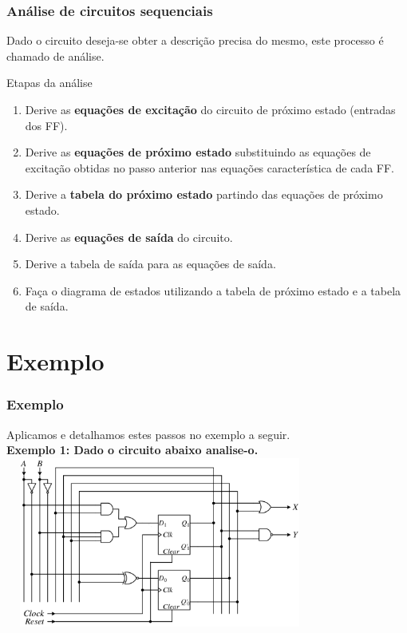 \documentclass{beamer}
\begin{document}
\begin{frame}
  \frametitle{Análise de circuitos sequenciais}
  Dado o circuito deseja-se obter a descrição precisa do mesmo, este processo é 
  chamado de análise.

  \begin{block}{Etapas da análise}
   \begin{enumerate}
    \item Derive as \textbf{equações de excitação} do circuito de próximo 
      estado (entradas dos FF).
      \pause
    \item Derive as \textbf{equações de próximo estado} substituindo as 
      equações de excitação obtidas no passo anterior nas equações 
      característica de cada FF.
      \pause
    \item Derive a \textbf{tabela do próximo estado} partindo das equações de 
      próximo estado.
      \pause
    \item Derive as \textbf{equações de saída} do circuito.
      \pause
    \item Derive a tabela de saída para as equações de saída.
      \pause
    \item Faça o diagrama de estados utilizando a tabela de próximo estado e a 
      tabela de saída.
   \end{enumerate}
  \end{block}
\end{frame}

\section{Exemplo}

\begin{frame}
  \frametitle{Exemplo}
  Aplicamos e detalhamos estes passos no exemplo a seguir.\\
  
  \textbf{Exemplo 1: Dado o circuito abaixo analise-o.}
  \includegraphics[height = 2.2in, width = 4in]{images/EXEMPLO_ANALISE_1.png}
\end{frame}
\end{document}
